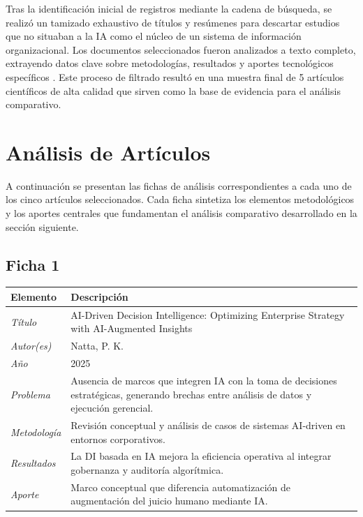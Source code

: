 \documentclass[conference]{IEEEtran}
\begin{document}
Tras la identificación inicial de registros mediante la cadena de búsqueda, se realizó un tamizado exhaustivo de títulos y resúmenes para descartar estudios que no situaban a la IA como el núcleo de un sistema de información organizacional. Los documentos seleccionados fueron analizados a texto completo, extrayendo datos clave sobre metodologías, resultados y aportes tecnológicos específicos \cite{natta2025}. Este proceso de filtrado resultó en una muestra final de 5 artículos científicos de alta calidad que sirven como la base de evidencia para el análisis comparativo.

\section{Análisis de Artículos}
 
A continuación se presentan las fichas de análisis correspondientes a cada uno de los cinco artículos seleccionados. Cada ficha sintetiza los elementos metodológicos y los aportes centrales que fundamentan el análisis comparativo desarrollado en la sección siguiente.
 
\subsection*{Ficha 1}
\begin{center}
\small
\begin{minipage}{\columnwidth}
\label{tab:ficha1}
\begin{tabular}{p{1.6cm} p{5.9cm}}
\toprule
\textbf{Elemento} & \textbf{Descripción} \\
\midrule
\textit{Título} & AI-Driven Decision Intelligence: Optimizing Enterprise Strategy with AI-Augmented Insights \\
\addlinespace
\textit{Autor(es)} & Natta, P. K. \\
\addlinespace
\textit{Año} & 2025 \\
\addlinespace
\textit{Problema} & Ausencia de marcos que integren IA con la toma de decisiones estratégicas, generando brechas entre análisis de datos y ejecución gerencial. \\
\addlinespace
\textit{Metodología} & Revisión conceptual y análisis de casos de sistemas AI-driven en entornos corporativos. \\
\addlinespace
\textit{Resultados} & La DI basada en IA mejora la eficiencia operativa al integrar gobernanza y auditoría algorítmica. \\
\addlinespace
\textit{Aporte} & Marco conceptual que diferencia automatización de augmentación del juicio humano mediante IA. \\
\bottomrule
\end{tabular}
\end{minipage}
\end{center}
 
\end{document}
